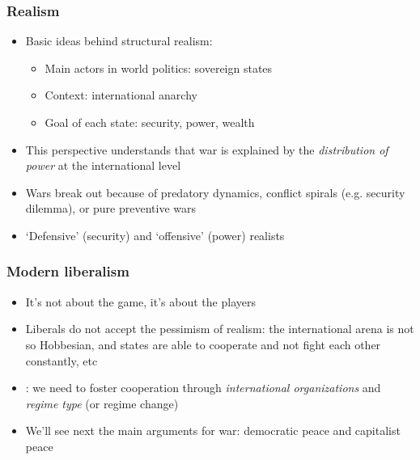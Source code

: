 \documentclass[aspectratio=43,handout]{beamer}
\begin{document}
\begin{frame}
\frametitle{Realism}
\centering

\begin{itemize}
\item<1-> Basic ideas behind structural realism:
  \begin{itemize}
  \item Main actors in world politics: sovereign states
  \item Context: international anarchy
  \item Goal of each state: security, power, wealth
  \end{itemize}
\item<2-> This perspective understands that war is explained by the \textit{distribution of power} at the international level
\item<3-> Wars break out because of predatory dynamics, conflict spirals (e.g. security dilemma), or pure preventive wars
\item<4-> `Defensive' (security) and `offensive' (power) realists
\end{itemize}

\end{frame}

\begin{frame}
\frametitle{Modern liberalism}
\centering

\begin{itemize}[<+->]
  \item It's not about the game, it's about the players
  \item Liberals do not accept the pessimism of realism: the international arena is not so Hobbesian, and states are able to cooperate and not fight each other constantly, etc
  \item {}: we need to foster cooperation through \textit{international organizations} and \textit{regime type} (or regime change)
  \item We'll see next the main arguments for war: democratic peace and capitalist peace
\end{itemize}

\end{frame}
\end{document}
